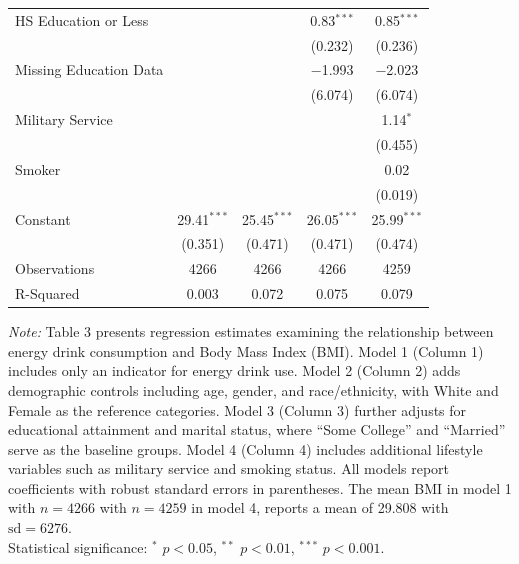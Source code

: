 \begin{table}[htbp]
\begin{tabular}{lcccc}
HS Education or Less   &         &         & 0.83$^{***}$ & 0.85$^{***}$ \\
                       &         &         & (0.232) & (0.236) \\
Missing Education Data &         &         & $-$1.993 & $-$2.023 \\
                       &         &         & (6.074) & (6.074) \\
Military Service       &         &         &         & 1.14$^{*}$ \\
                       &         &         &         & (0.455) \\
Smoker                 &         &         &         & 0.02 \\
                       &         &         &         & (0.019) \\
Constant               & 29.41$^{***}$ & 25.45$^{***}$ & 26.05$^{***}$ & 25.99$^{***}$ \\
                       & (0.351) & (0.471) & (0.471) & (0.474) \\
\midrule
Observations           & 4266 & 4266 & 4266 & 4259 \\
R-Squared              & 0.003 & 0.072 & 0.075 & 0.079 \\
\bottomrule
\end{tabular}

\smallskip
\footnotesize\textit{Note:} Table 3 presents regression estimates examining the relationship between energy drink consumption and Body Mass Index (BMI). Model 1 (Column 1) includes only an indicator for energy drink use. Model 2 (Column 2) adds demographic controls including age, gender, and race/ethnicity, with White and Female as the reference categories. Model 3 (Column 3) further adjusts for educational attainment and marital status, where ``Some College'' and ``Married'' serve as the baseline groups. Model 4 (Column 4) includes additional lifestyle variables such as military service and smoking status. All models report coefficients with robust standard errors in parentheses. The mean BMI in model 1 with $n=4266$ with $n=4259$ in model 4, reports a mean of 29.808 with $\text{sd}=6276$. \\
Statistical significance: $^{*}$ $p < 0.05$, $^{**}$ $p < 0.01$, $^{***}$ $p < 0.001$.
\end{table}
